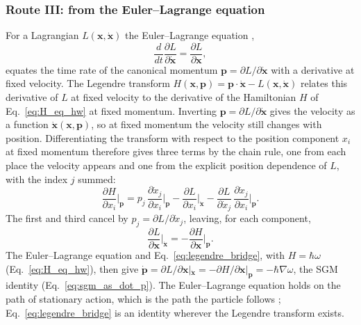 \documentclass[aps,prd,onecolumn,tightenlines,nofootinbib,notitlepage,11pt,floatfix]{revtex4-2}
\theoremstyle{indentedtheorem}
\begin{document}
\subsubsection{Route III: from the Euler--Lagrange equation}
\label{sec:route_lagrangian}

For a Lagrangian $L(\mathbf{x},\dot{\mathbf{x}})$ the Euler--Lagrange equation \citep{Euler1744Methodus,Lagrange1788Mecanique},
\begin{equation}
    \frac{d}{dt}\frac{\partial L}{\partial\dot{\mathbf{x}}} = \frac{\partial L}{\partial\mathbf{x}} ,
    \label{eq:euler_lagrange}
\end{equation}
equates the time rate of the canonical momentum $\mathbf{p}=\partial L/\partial\dot{\mathbf{x}}$ with a derivative at fixed velocity. The Legendre transform $H(\mathbf{x},\mathbf{p})=\mathbf{p}\cdot\dot{\mathbf{x}}-L(\mathbf{x},\dot{\mathbf{x}})$ relates this derivative of $L$ at fixed velocity to the derivative of the Hamiltonian $H$ of Eq.~\eqref{eq:H_eq_hw} at fixed momentum. Inverting $\mathbf{p}=\partial L/\partial\dot{\mathbf{x}}$ gives the velocity as a function $\dot{\mathbf{x}}(\mathbf{x},\mathbf{p})$, so at fixed momentum the velocity still changes with position. Differentiating the transform with respect to the position component $x_i$ at fixed momentum therefore gives three terms by the chain rule, one from each place the velocity appears and one from the explicit position dependence of $L$, with the index $j$ summed:
\begin{equation}
    \frac{\partial H}{\partial x_i}\bigg|_{\mathbf{p}} = p_j\,\frac{\partial\dot{x}_j}{\partial x_i}\bigg|_{\mathbf{p}} - \frac{\partial L}{\partial x_i}\bigg|_{\dot{\mathbf{x}}} - \frac{\partial L}{\partial\dot{x}_j}\,\frac{\partial\dot{x}_j}{\partial x_i}\bigg|_{\mathbf{p}} .
    \label{eq:legendre_chain}
\end{equation}
The first and third cancel by $p_j=\partial L/\partial\dot{x}_j$, leaving, for each component,
\begin{equation}
    \frac{\partial L}{\partial\mathbf{x}}\bigg|_{\dot{\mathbf{x}}} = -\frac{\partial H}{\partial\mathbf{x}}\bigg|_{\mathbf{p}} .
    \label{eq:legendre_bridge}
\end{equation}
The Euler--Lagrange equation and Eq.~\eqref{eq:legendre_bridge}, with $H=\hbar\omega$ (Eq.~\eqref{eq:H_eq_hw}), then give $\dot{\mathbf{p}}=\partial L/\partial\mathbf{x}|_{\dot{\mathbf{x}}}=-\partial H/\partial\mathbf{x}|_{\mathbf{p}}=-\hbar\nabla\omega$, the SGM identity (Eq.~\eqref{eq:sgm_as_dot_p}). The Euler--Lagrange equation holds on the path of stationary action, which is the path the particle follows \citep{Goldstein2002Classical}; Eq.~\eqref{eq:legendre_bridge} is an identity wherever the Legendre transform exists.
\end{document}
